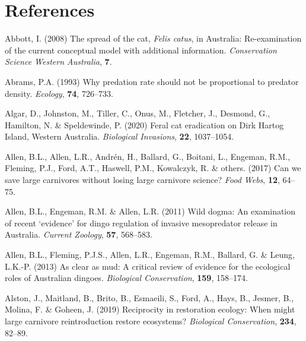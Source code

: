 \documentclass[11pt,a4paper,titlepage,twoside,openright]{style/unimelbthesis}
\begin{document}
\begin{mainmatter}
\hypertarget{references}{%
\chapter*{References}\label{references}}


\noindent

\setlength{\parindent}{-0.20in}
\setlength{\leftskip}{0.20in}

\hypertarget{refs}{}
\leavevmode\hypertarget{ref-abbott2008spread}{}%
Abbott, I. (2008) The spread of the cat, \emph{Felis catus}, in Australia: Re-examination of the current conceptual model with additional information. \emph{Conservation Science Western Australia}, \textbf{7}.

\leavevmode\hypertarget{ref-abrams1993predation}{}%
Abrams, P.A. (1993) Why predation rate should not be proportional to predator density. \emph{Ecology}, \textbf{74}, 726--733.

\leavevmode\hypertarget{ref-algar2020feral}{}%
Algar, D., Johnston, M., Tiller, C., Onus, M., Fletcher, J., Desmond, G., Hamilton, N. \& Speldewinde, P. (2020) Feral cat eradication on Dirk Hartog Island, Western Australia. \emph{Biological Invasions}, \textbf{22}, 1037--1054.

\leavevmode\hypertarget{ref-allen2017can}{}%
Allen, B.L., Allen, L.R., Andrén, H., Ballard, G., Boitani, L., Engeman, R.M., Fleming, P.J., Ford, A.T., Haswell, P.M., Kowalczyk, R. \& others. (2017) Can we save large carnivores without losing large carnivore science? \emph{Food Webs}, \textbf{12}, 64--75.

\leavevmode\hypertarget{ref-allen2011wild}{}%
Allen, B.L., Engeman, R.M. \& Allen, L.R. (2011) Wild dogma: An examination of recent `evidence' for dingo regulation of invasive mesopredator release in Australia. \emph{Current Zoology}, \textbf{57}, 568--583.

\leavevmode\hypertarget{ref-allen2013clear}{}%
Allen, B.L., Fleming, P.J.S., Allen, L.R., Engeman, R.M., Ballard, G. \& Leung, L.K.-P. (2013) As clear as mud: A critical review of evidence for the ecological roles of Australian dingoes. \emph{Biological Conservation}, \textbf{159}, 158--174.

\leavevmode\hypertarget{ref-alston2019reciprocity}{}%
Alston, J., Maitland, B., Brito, B., Esmaeili, S., Ford, A., Hays, B., Jesmer, B., Molina, F. \& Goheen, J. (2019) Reciprocity in restoration ecology: When might large carnivore reintroduction restore ecosystems? \emph{Biological Conservation}, \textbf{234}, 82--89.


\end{mainmatter}
\end{document}
